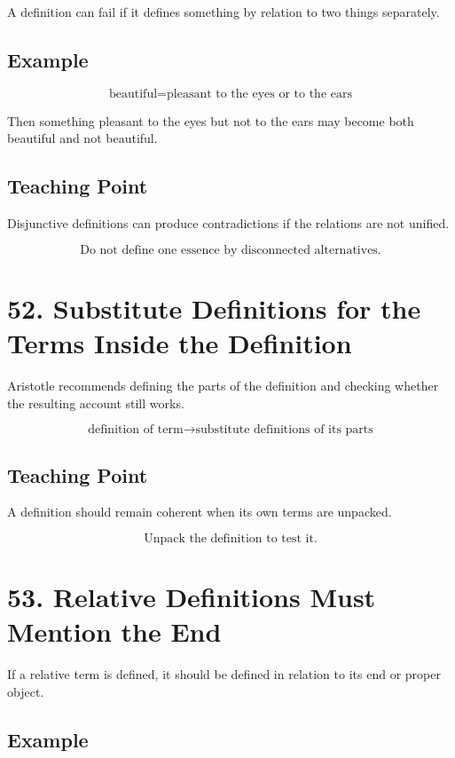 \documentclass[12pt]{article}
\begin{document}
A definition can fail if it defines something by relation to two things
separately.

\subsection*{Example}

\[
\text{beautiful} = \text{pleasant to the eyes or to the ears}
\]

Then something pleasant to the eyes but not to the ears may become both
beautiful and not beautiful.

\subsection*{Teaching Point}

Disjunctive definitions can produce contradictions if the relations are not
unified.

\[
\boxed{
\text{Do not define one essence by disconnected alternatives.}
}
\]

\section*{52. Substitute Definitions for the Terms Inside the Definition}

Aristotle recommends defining the parts of the definition and checking whether
the resulting account still works.

\[
\text{definition of term}
\rightarrow
\text{substitute definitions of its parts}
\]

\subsection*{Teaching Point}

A definition should remain coherent when its own terms are unpacked.

\[
\boxed{
\text{Unpack the definition to test it.}
}
\]

\section*{53. Relative Definitions Must Mention the End}

If a relative term is defined, it should be defined in relation to its end or
proper object.

\subsection*{Example}
\end{document}
